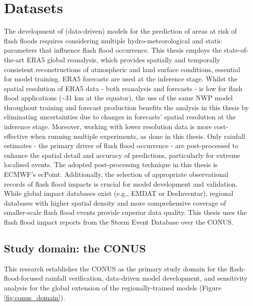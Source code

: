 \chapter{Datasets}
\label{datasets}
\graphicspath{{chapter_04/figures}{chapter_04/tables}}


The development of (data-driven) models for the prediction of areas at risk of flash floods requires considering multiple hydro-meteorological and static parameters that influence flash flood occurrence. This thesis employs the state-of-the-art ERA5 global reanalysis, which provides spatially and temporally consistent reconstructions of atmospheric and land surface conditions, essential for model training. ERA5 forecasts are used at the inference stage. Whilst the spatial resolution of ERA5 data - both reanalysis and forecasts - is low for flash flood applications (\sim31 km at the equator), the use of the same NWP model throughout training and forecast production benefits the analysis in this thesis by eliminating uncertainties due to changes in forecasts' spatial resolution at the inference stage. Moreover, working with lower resolution data is more cost-effective when running multiple experiments, as done in this thesis. Only rainfall estimates - the primary driver of flash flood occurrence - are post-processed to enhance the spatial detail and accuracy of predictions, particularly for extreme localised events. The adopted post-processing technique in this thesis is ECMWF's ecPoint. Additionally, the selection of appropriate observational records of flash flood impacts is crucial for model development and validation. While global impact databases exist (e.g., EMDAT or DesInventar), regional databases with higher spatial density and more comprehensive coverage of smaller-scale flash flood events provide superior data quality. This thesis uses the flash flood impact reports from the Storm Event Database over the CONUS.


\section{Study domain: the CONUS}
\label{datasets_domain}

This research establishes the CONUS as the primary study domain for the flash-flood-focused rainfall verification, data-driven model development, and sensitivity analysis for the global extension of the regionally-trained models (Figure \ref{fig:conus_domain}).

